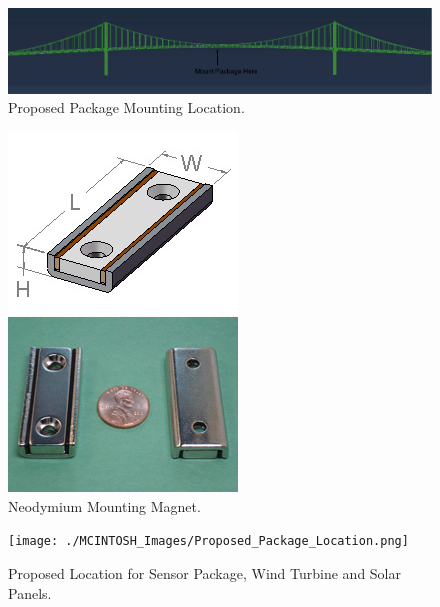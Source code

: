 \begin{figure}[h]
\centering
\includegraphics[width=\textwidth]{./MCINTOSH_Images/Bridge_Full_.png}
\caption{Proposed Package Mounting Location.}
\label{fig:PackageLocation}
\end{figure}

\begin{figure}[h]
\centering
\includegraphics[width=\textwidth]{./MCINTOSH_Images/Neodymium_Mounting_Magnet.jpg}
\caption{Neodymium Mounting Magnet.}
\label{fig:Mounting Magnet}
\end{figure}

\begin{figure}[h]
\centering
\texttt{[image: ./MCINTOSH\_Images/Proposed\_Package\_Location.png]}
\caption{Proposed Location for Sensor Package, Wind Turbine and Solar Panels.}
\label{fig:Proposed Package, Panels and Turbine Location}
\end{figure}

